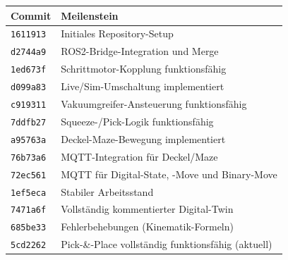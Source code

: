 \documentclass[11pt,a4paper]{article}
\begin{document}
\begin{center}
\begin{tabular}{lp{9cm}}
  \toprule
  Commit & Meilenstein \\
  \midrule
  \texttt{1611913} & Initiales Repository-Setup \\
  \texttt{d2744a9} & ROS2-Bridge-Integration und Merge \\
  \texttt{1ed673f} & Schrittmotor-Kopplung funktionsfähig \\
  \texttt{d099a83} & Live/Sim-Umschaltung implementiert \\
  \texttt{c919311} & Vakuumgreifer-Ansteuerung funktionsfähig \\
  \texttt{7ddfb27} & Squeeze-/Pick-Logik funktionsfähig \\
  \texttt{a95763a} & Deckel-Maze-Bewegung implementiert \\
  \texttt{76b73a6} & MQTT-Integration für Deckel/Maze \\
  \texttt{72ec561} & MQTT für Digital-State, -Move und Binary-Move \\
  \texttt{1ef5eca} & Stabiler Arbeitsstand \\
  \texttt{7471a6f} & Vollständig kommentierter Digital-Twin \\
  \texttt{685be33} & Fehlerbehebungen (Kinematik-Formeln) \\
  \texttt{5cd2262} & Pick-\&-Place vollständig funktionsfähig (aktuell) \\
  \bottomrule
\end{tabular}
\end{center}
\end{document}
